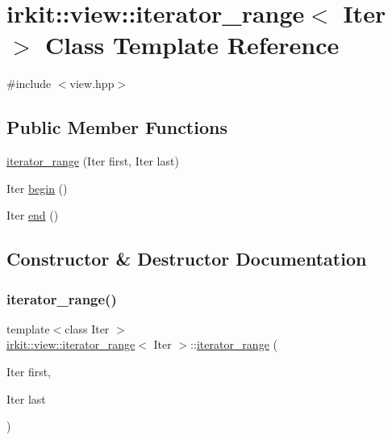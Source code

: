 \hypertarget{classirkit_1_1view_1_1iterator__range}{}\section{irkit\+:\+:view\+:\+:iterator\+\_\+range$<$ Iter $>$ Class Template Reference}
\label{classirkit_1_1view_1_1iterator__range}


{\ttfamily \#include $<$view.\+hpp$>$}

\subsection*{Public Member Functions}
\begin{DoxyCompactItemize}
\item 
\mbox{\hyperlink{classirkit_1_1view_1_1iterator__range_a471414436e90dfed5608b05d83a3497c}{iterator\+\_\+range}} (Iter first, Iter last)
\item 
Iter \mbox{\hyperlink{classirkit_1_1view_1_1iterator__range_a510f0a679cad2562b8537fafef71cf5e}{begin}} ()
\item 
Iter \mbox{\hyperlink{classirkit_1_1view_1_1iterator__range_ae3f8255c281477d615a56b81c736cdae}{end}} ()
\end{DoxyCompactItemize}


\subsection{Constructor \& Destructor Documentation}
\mbox{\label{classirkit_1_1view_1_1iterator__range_a471414436e90dfed5608b05d83a3497c}} 
\subsubsection{\texorpdfstring{iterator\+\_\+range()}{iterator\_range()}}
{\footnotesize\ttfamily template$<$class Iter $>$ \\
\mbox{\hyperlink{classirkit_1_1view_1_1iterator__range}{irkit\+::view\+::iterator\+\_\+range}}$<$ Iter $>$\+::\mbox{\hyperlink{classirkit_1_1view_1_1iterator__range}{iterator\+\_\+range}} (\begin{DoxyParamCaption}\item[{Iter}]{first,  }\item[{Iter}]{last }\end{DoxyParamCaption})\hspace{0.3cm}{\ttfamily [inline]}}




